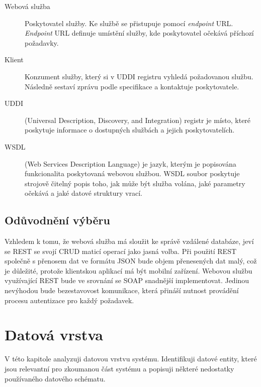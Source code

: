 \documentclass{diplomka}
\begin{document}
\begin{description}
\item [Webová služba] Poskytovatel služby. Ke službě se přistupuje pomocí \emph{endpoint} URL. \emph{Endpoint} URL definuje umístění služby, kde poskytovatel očekává příchozí požadavky.
\item [Klient] Konzument služby, který si v UDDI registru vyhledá požadovanou službu. Následně sestaví zprávu podle specifikace a kontaktuje poskytovatele.
\item [UDDI\cite{uddi}] (Universal Description, Discovery, and Integration) registr je místo, které poskytuje informace o dostupných službách a jejich poskytovatelích. 
\item [WSDL\cite{wsdl}] (Web Services Description Language) je jazyk, kterým je popisována funkcionalita poskytovaná webovou službou. WSDL soubor poskytuje strojově čitelný popis toho, jak může být služba volána, jaké parametry očekává a jaké datové struktury vrací.
\end{description}

\subsection{Odůvodnění výběru}
Vzhledem k tomu, že webová služba má sloužit ke správě vzdálené databáze, jeví se REST se svojí CRUD maticí operací jako jasná volba. Při použití REST společně s přenosem dat ve formátu JSON bude objem přenesených dat malý, což je důležité, protože klientskou aplikací má být mobilní zařízení. Webovou službu využívající REST bude ve srovnání se SOAP snadnější implementovat. Jedinou nevýhodou bude bezestavovost komunikace, která přináší nutnost provádění procesu autentizace pro každý požadavek.

\section{Datová vrstva}
V této kapitole analyzuji datovou vrstvu systému. Identifikuji datové entity, které jsou relevantní pro zkoumanou část systému a popisuji některé nedostatky používaného datového schématu.
\end{document}
